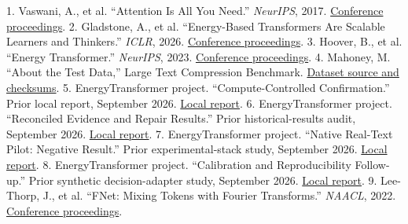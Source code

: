 \documentclass[11pt,letterpaper]{article}
\begin{document}
1. Vaswani, A., et al. “Attention Is All You Need.” \emph{NeurIPS}, 2017. \href{https://proceedings.neurips.cc/paper/2017/hash/3f5ee243547dee91fbd053c1c4a845aa-Abstract.html}{Conference proceedings}.
2. Gladstone, A., et al. “Energy-Based Transformers Are Scalable Learners and Thinkers.” \emph{ICLR}, 2026. \href{https://proceedings.iclr.cc/paper\_files/paper/2026/hash/e19a65fd53b6f9a88b354da98813465d-Abstract-Conference.html}{Conference proceedings}.
3. Hoover, B., et al. “Energy Transformer.” \emph{NeurIPS}, 2023. \href{https://proceedings.neurips.cc/paper\_files/paper/2023/hash/57a9b97477b67936298489e3c1417b0a-Abstract-Conference.html}{Conference proceedings}.
4. Mahoney, M. “About the Test Data,” Large Text Compression Benchmark. \href{https://mattmahoney.net/dc/textdata.html}{Dataset source and checksums}.
5. EnergyTransformer project. “Compute-Controlled Confirmation.” Prior local report, September 2026. \href{../reports/compute\_confirmation/REPORT.md}{Local report}.
6. EnergyTransformer project. “Reconciled Evidence and Repair Results.” Prior historical-results audit, September 2026. \href{../FINDINGS.md}{Local report}.
7. EnergyTransformer project. “Native Real-Text Pilot: Negative Result.” Prior experimental-stack study, September 2026. \href{../../EnergyTransformer-diffusion-state/reports/experimental\_stack/real\_text\_pilot\_001/REPORT.md}{Local report}.
8. EnergyTransformer project. “Calibration and Reproducibility Follow-up.” Prior synthetic decision-adapter study, September 2026. \href{../../EnergyTransformer-diffusion-state/reports/sentinel\_reasoning/POLISH.md}{Local report}.
9. Lee-Thorp, J., et al. “FNet: Mixing Tokens with Fourier Transforms.” \emph{NAACL}, 2022. \href{https://aclanthology.org/2022.naacl-main.319/}{Conference proceedings}.
\end{document}
